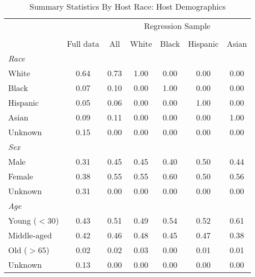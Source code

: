 \begin{table}[htbp]
\caption{Summary Statistics By Host Race: Host Demographics}
\begin{center}%
\small\begin{tabular}{l c | c | c c c c}
& \multicolumn{1}{c}{} & \multicolumn{5}{c}{Regression Sample}
\\
 \cmidrule(r){3-7}
\\
 & \multicolumn{1}{c}{Full data} & \multicolumn{1}{c}{All} & White & Black & Hispanic & Asian
\\
\hline\hline\noalign{\smallskip} 
 \textit{Race} &&&&&& \\
 \hspace{10bp}White & 0.64 & 0.73 &  1.00 & 0.00 &  0.00 & 0.00 \\  \hspace{10bp}Black & 0.07 & 0.10 &  0.00 & 1.00 &  0.00 & 0.00 \\  \hspace{10bp}Hispanic & 0.05 & 0.06 &  0.00 & 0.00 &  1.00 & 0.00 \\  \hspace{10bp}Asian & 0.09 & 0.11 &  0.00 & 0.00 &  0.00 & 1.00 \\  \hspace{10bp}Unknown & 0.15 & {0.00} & {0.00} &  {0.00}  & {0.00}  & {0.00} \\  \textit{Sex} &&&&&& \\
 \hspace{10bp}Male & 0.31 & 0.45 &  0.45 & 0.40 &  0.50 & 0.44 \\  \hspace{10bp}Female & 0.38 & 0.55 &  0.55 & 0.60 &  0.50 & 0.56 \\  \hspace{10bp}Unknown & 0.31 & {0.00} & {0.00} &  {0.00}  & {0.00}  & {0.00} \\  \textit{Age} &&&&&& \\
 \hspace{10bp}Young ($<30$) & 0.43 & 0.51 &  0.49 & 0.54 &  0.52 & 0.61 \\  \hspace{10bp}Middle-aged & 0.42 & 0.46 &  0.48 & 0.45 &  0.47 & 0.38 \\  \hspace{10bp}Old ($>65$) & 0.02 & 0.02 &  0.03 & 0.00 &  0.01 & 0.01 \\  \hspace{10bp}Unknown & 0.13 & {0.00} & {0.00} &  {0.00}  & {0.00}  & {0.00} \\ \hline

\end{tabular}
\end{center}
\end{table}
